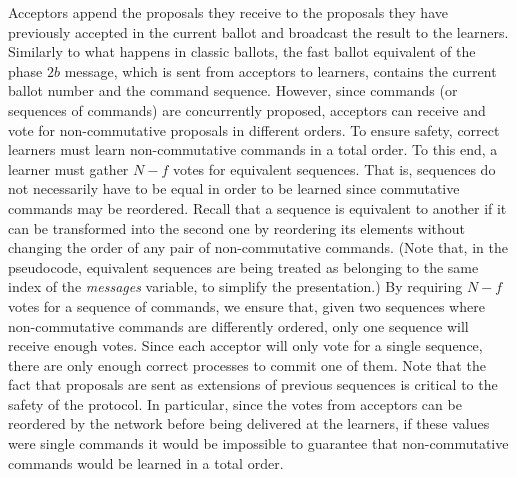 Acceptors append the proposals they receive to the proposals they have previously accepted in the current ballot and broadcast the result to the learners. Similarly to what happens in classic ballots, the fast ballot equivalent of the phase $2b$ message, which is sent from acceptors to learners, contains the current ballot number and the command sequence. However, since commands (or sequences of commands) are concurrently proposed, acceptors can receive and vote for non-commutative proposals in different orders. To ensure safety, correct learners must learn non-commutative commands in a total order. To this end, a learner must gather $N-f$ votes for equivalent sequences. That is, sequences do not necessarily have to be equal in order to be learned since commutative commands may be reordered. Recall that a sequence is equivalent to another if it can be transformed into the second one by reordering its elements without changing the order of any pair of non-commutative commands. (Note that, in the pseudocode, equivalent sequences are being treated as belonging to the same index of the \emph{messages} variable, to simplify the presentation.) By requiring $N-f$ votes for a sequence of commands, we ensure that, given two sequences where non-commutative commands are differently ordered, only one sequence will receive enough votes. Since each acceptor will only vote for a single sequence, there are only enough correct processes to commit one of them. Note that the fact that proposals are sent as extensions of previous sequences is critical to the safety of the protocol. In particular, since the votes from acceptors can be reordered by the network before being delivered at the learners, if these values were single commands it would be impossible to guarantee that non-commutative commands would be learned in a total order. \par

